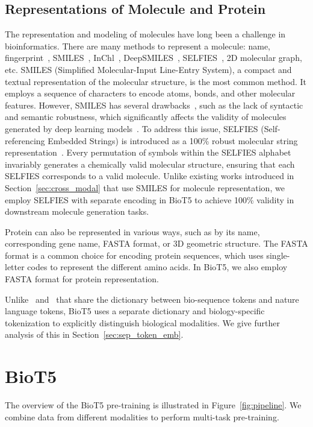 \documentclass[11pt]{article}
\newcommand{\method}{{BioT5}}
\begin{document}
\subsection{Representations of Molecule and Protein}
\label{sec:mol_pro_rep}
The representation and modeling of molecules have long been a challenge in bioinformatics.
There are many methods to represent a molecule: name, fingerprint~\citep{rogers2010extended}, SMILES~\citep{weininger1988smiles,weininger1989smiles}, InChl~\citep{heller2013inchi}, DeepSMILES~\citep{o2018deepsmiles}, SELFIES~\citep{krenn2020self}, 2D molecular graph, etc.
SMILES (Simplified Molecular-Input Line-Entry System), a compact and textual representation of the molecular structure, is the most common method. It employs a sequence of characters to encode atoms, bonds, and other molecular features.
However, SMILES has several drawbacks~\citep{krenn2022selfies}, such as the lack of syntactic and semantic robustness, which significantly affects the validity of molecules generated by deep learning models~\citep{DBLP:conf/emnlp/EdwardsLRHCJ22}.
To address this issue, SELFIES (Self-referencing Embedded Strings) is introduced as a 100\% robust molecular string representation~\citep{krenn2020self}.
Every permutation of symbols within the SELFIES alphabet invariably generates a chemically valid molecular structure, ensuring that each SELFIES corresponds to a valid molecule. 
Unlike existing works introduced in Section~\ref{sec:cross_modal} that use SMILES for molecule representation, we employ SELFIES with separate encoding in \method{} to achieve 100\% validity in downstream molecule generation tasks.

Protein can also be represented in various ways, such as by its name, corresponding gene name, FASTA format, or 3D geometric structure.
The FASTA format is a common choice for encoding protein sequences, which uses single-letter codes to represent the  different amino acids. 
In \method, we also employ FASTA format for protein representation.

Unlike~\citet{DBLP:conf/emnlp/EdwardsLRHCJ22} and~\citet{taylor2022galactica} that share the dictionary between bio-sequence tokens and nature language tokens, \method{} uses a separate dictionary and biology-specific tokenization to explicitly distinguish biological modalities. 
We give further analysis of this in Section~\ref{sec:sep_token_emb}.

\section{BioT5}
The overview of the \method{} pre-training is illustrated in Figure~\ref{fig:pipeline}.
We combine data from different modalities to perform multi-task pre-training.
\end{document}
